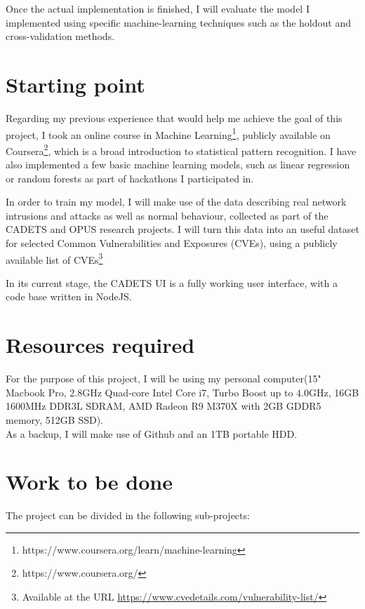 Once the actual implementation is finished, I will evaluate the model I implemented using specific machine-learning techniques such as the holdout and cross-validation methods. 

\section*{Starting point}

Regarding my previous experience that would help me achieve the goal of this project, I took an online course in Machine Learning\footnote{https://www.coursera.org/learn/machine-learning}, publicly available on Coursera\footnote{https://www.coursera.org/}, which is a broad introduction to statistical pattern recognition. I have also implemented a few basic machine learning models, such as linear regression or random forests as part of hackathons I participated in. 

In order to train my model, I will make use of the data describing real network intrusions and attacks as well as normal behaviour, collected as part of the CADETS and OPUS research projects. I will turn this data into an useful dataset for selected Common Vulnerabilities and Exposures (CVEs), using a publicly available list of CVEs\footnote{Available at the URL \url{https://www.cvedetails.com/vulnerability-list/}}

In its current stage, the CADETS UI is a fully working user interface, with a code base written in NodeJS. 

\section*{Resources required}
For the purpose of this project, I will be using my personal computer(15" Macbook Pro, 2.8GHz Quad-core Intel Core i7, Turbo Boost up to 4.0GHz, 16GB 1600MHz DDR3L SDRAM, AMD Radeon R9 M370X with 2GB GDDR5 memory, 512GB SSD).\\

As a backup, I will make use of Github and an 1TB portable HDD.

\section*{Work to be done}

The project can be divided in the following sub-projects: 

